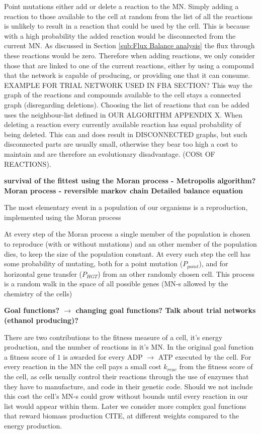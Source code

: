 \documentclass[10pt,a4paper]{article}
\begin{document}
	Point mutations either add or delete a reaction to the MN. Simply adding a reaction to those available to the cell at random from the list of all the reactions is unlikely to result in a reaction that could be used by the cell. This is because with a high probability the added reaction would be disconnected from the current MN. As discussed in Section \ref{sub:Flux Balance analysis} the flux through these reactions would be zero. Therefore when adding reactions, we only consider those that are linked  to one of the current reactions, either by using a compound that  the network is capable of producing, or providing one that it can consume. EXAMPLE FOR TRIAL NETWORK USED IN FBA SECTION? This way the graph of the reactions and compounds available to the cell stays a connected graph (disregarding deletions). Choosing the list of reactions that can be added uses the neighbour-list defined in OUR ALGORITHM APPENDIX X. When deleting a reaction every currently available reaction has equal probability of being deleted. This can and does result in DISCONNECTED graphs, but such disconnected parts are usually small, otherwise they bear too high a cost to maintain and are therefore an evolutionary disadvantage. (COSt OF REACTIONS).  
	
\textbf{survival of the fittest using the Moran process - Metropolis algorithm?
Moran process - reversible markov chain
Detailed balance equation}


The most elementary event in a population of our organisms is a reproduction, implemented using the Moran process \cite{moranprocess} 

At every step of the Moran process a single member of the population is chosen to reproduce (with or without mutations) and an other member of the population dies, to keep the size of the population constant. At every such step the cell has some probability of mutating, both for a point mutation ($P_{point}$), and for horizontal gene transfer ($P_{HGT}$) from an other randomly chosen cell.  This process is a random walk in the space of all possible genes (MN-s allowed by the chemistry of the cells) 


\textbf{Goal functions? $\rightarrow$ changing goal functions? Talk about trial networks (ethanol producing)?}

There are two contributions to the fitness measure of a cell, it's energy production, and the number of reactions in it's MN.  In the original goal function a fitness score of $1$ is awarded for every ADP $\rightarrow$ ATP executed by the cell. For every reaction in the MN the cell pays a small cost $k_{reac}$  from the fitness score of the cell, as cells usually control their reactions through the use of enzymes that they have to manufacture, and code in their genetic code. Should we not include this cost the cell's MN-s could grow without bounds until every reaction in our list would appear within them. Later we consider more complex goal functions that reward biomass production CITE, at different weights compared to the energy production. 
\end{document}
